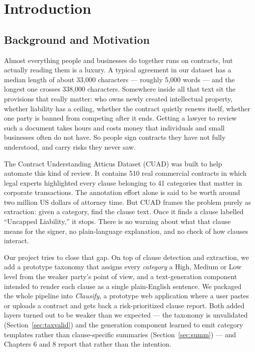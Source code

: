 \chapter{Introduction}

\section{Background and Motivation}
Almost everything people and businesses do together runs on contracts, but actually reading them is a luxury. A typical agreement in our dataset has a median length of about 33{,}000 characters --- roughly 5{,}000 words --- and the longest one crosses 338{,}000 characters. Somewhere inside all that text sit the provisions that really matter: who owns newly created intellectual property, whether liability has a ceiling, whether the contract quietly renews itself, whether one party is banned from competing after it ends. Getting a lawyer to review such a document takes hours and costs money that individuals and small businesses often do not have. So people sign contracts they have not fully understood, and carry risks they never saw.

The Contract Understanding Atticus Dataset (CUAD) \cite{hendrycks2021cuad} was built to help automate this kind of review. It contains 510 real commercial contracts in which legal experts highlighted every clause belonging to 41 categories that matter in corporate transactions. The annotation effort alone is said to be worth around two million US dollars of attorney time. But CUAD frames the problem purely as extraction: given a category, find the clause text. Once it finds a clause labelled ``Uncapped Liability,'' it stops. There is no warning about what that clause means for the signer, no plain-language explanation, and no check of how clauses interact.

Our project tries to close that gap. On top of clause detection and extraction, we add a prototype taxonomy that assigns every \emph{category} a High, Medium or Low level from the weaker party's point of view, and a text-generation component intended to render each clause as a single plain-English sentence. We packaged the whole pipeline into \emph{Clausify}, a prototype web application where a user pastes or uploads a contract and gets back a risk-prioritized clause report. Both added layers turned out to be weaker than we expected --- the taxonomy is unvalidated (Section~\ref{sec:taxvalid}) and the generation component learned to emit category templates rather than clause-specific summaries (Section~\ref{sec:summ}) --- and Chapters 6 and 8 report that rather than the intention.

